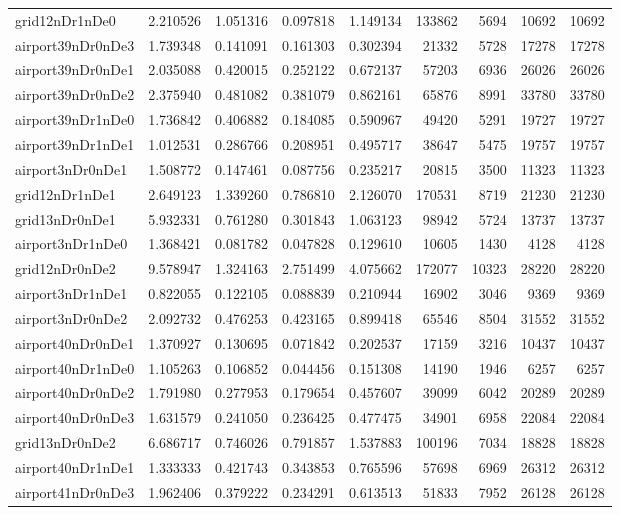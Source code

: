 \begin{longtable}{|l|r|r|r|r|r|r|r|r|}
grid12nDr1nDe0 & 2.210526 & 1.051316 & 0.097818 & 1.149134 & 133862 & 5694 & 10692 & 10692 \\
airport39nDr0nDe3 & 1.739348 & 0.141091 & 0.161303 & 0.302394 & 21332 & 5728 & 17278 & 17278 \\
airport39nDr0nDe1 & 2.035088 & 0.420015 & 0.252122 & 0.672137 & 57203 & 6936 & 26026 & 26026 \\
airport39nDr0nDe2 & 2.375940 & 0.481082 & 0.381079 & 0.862161 & 65876 & 8991 & 33780 & 33780 \\
airport39nDr1nDe0 & 1.736842 & 0.406882 & 0.184085 & 0.590967 & 49420 & 5291 & 19727 & 19727 \\
airport39nDr1nDe1 & 1.012531 & 0.286766 & 0.208951 & 0.495717 & 38647 & 5475 & 19757 & 19757 \\
airport3nDr0nDe1 & 1.508772 & 0.147461 & 0.087756 & 0.235217 & 20815 & 3500 & 11323 & 11323 \\
grid12nDr1nDe1 & 2.649123 & 1.339260 & 0.786810 & 2.126070 & 170531 & 8719 & 21230 & 21230 \\
grid13nDr0nDe1 & 5.932331 & 0.761280 & 0.301843 & 1.063123 & 98942 & 5724 & 13737 & 13737 \\
airport3nDr1nDe0 & 1.368421 & 0.081782 & 0.047828 & 0.129610 & 10605 & 1430 & 4128 & 4128 \\
grid12nDr0nDe2 & 9.578947 & 1.324163 & 2.751499 & 4.075662 & 172077 & 10323 & 28220 & 28220 \\
airport3nDr1nDe1 & 0.822055 & 0.122105 & 0.088839 & 0.210944 & 16902 & 3046 & 9369 & 9369 \\
airport3nDr0nDe2 & 2.092732 & 0.476253 & 0.423165 & 0.899418 & 65546 & 8504 & 31552 & 31552 \\
airport40nDr0nDe1 & 1.370927 & 0.130695 & 0.071842 & 0.202537 & 17159 & 3216 & 10437 & 10437 \\
airport40nDr1nDe0 & 1.105263 & 0.106852 & 0.044456 & 0.151308 & 14190 & 1946 & 6257 & 6257 \\
airport40nDr0nDe2 & 1.791980 & 0.277953 & 0.179654 & 0.457607 & 39099 & 6042 & 20289 & 20289 \\
airport40nDr0nDe3 & 1.631579 & 0.241050 & 0.236425 & 0.477475 & 34901 & 6958 & 22084 & 22084 \\
grid13nDr0nDe2 & 6.686717 & 0.746026 & 0.791857 & 1.537883 & 100196 & 7034 & 18828 & 18828 \\
airport40nDr1nDe1 & 1.333333 & 0.421743 & 0.343853 & 0.765596 & 57698 & 6969 & 26312 & 26312 \\
airport41nDr0nDe3 & 1.962406 & 0.379222 & 0.234291 & 0.613513 & 51833 & 7952 & 26128 & 26128 \\

\end{longtable}
